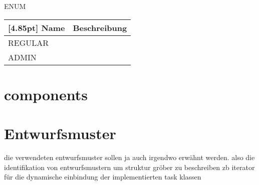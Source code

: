     		ENUM
                \begin{center}
                	\renewcommand{\arraystretch}{1.5}
    	            \setlength\tabcolsep{5pt}
                	\begin{tabularx}{\textwidth}{|l|X|}
                		\hline
                        \rowcolor[gray]{0.75}[4.85pt]
                	    Name & Beschreibung \\ \hline
                		REGULAR &  \\ \hline
                		ADMIN &  \\ \hline
                	\end{tabularx}
                \end{center}
    
        \section{components}
	
	\section{Entwurfsmuster}
	die verwendeten entwurfsmuster sollen ja auch irgendwo erwähnt werden.
	also die identifikation von entwurfsmustern um struktur gröber zu beschreiben
	zb iterator für die dynamische einbindung der implementierten task klassen
	        